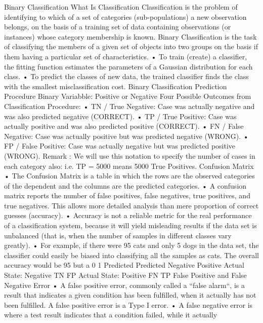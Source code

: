 \documentclass[a4paper,12pt]{article}
\begin{document}
Binary Classification
What Is Classification
Classification is the problem of identifying to which of a set of categories (sub-populations) a new
observation belongs, on the basis of a training set of data containing observations (or instances)
whose category membership is known. Binary Classification is the task of classifying the members of
a given set of objects into two groups on the basis if them having a particular set of characteristics.
• To train (create) a classifier, the fitting function estimates the parameters of a Gaussian
distribution for each class.
• To predict the classes of new data, the trained classifier finds the class with the smallest
misclassification cost.
Binary Classification Prediction Procedure
Binary Variabble: Positive or Negative
Four Possible Outcomes from Classification Procedure:
• TN / True Negative: Case was actually negative and was also predicted negative
(CORRECT).
• TP / True Positive: Case was actually positive and was also predicted positive (CORRECT).
• FN / False Negative: Case was actually positive but was predicted negative
(WRONG).
• FP / False Positive: Case was actually negative but was predicted positive (WRONG).
Remark : We will use this notation to specify the number of cases in each category also: i.e. TP
= 5000 means 5000 True Positives.
Confusion Matrix
• The Confusion Matrix is a table in which the rows are the observed categories of the dependent
and the columns are the predicted categories.
• A confusion matrix reports the number of false positives, false negatives, true positives, and
true negatives. This allows more detailed analysis than mere proportion of correct guesses
(accuracy).
• Accuracy is not a reliable metric for the real performance of a classification system, because
it will yield misleading results if the data set is unbalanced (that is, when the number of
samples in different classes vary greatly).
• For example, if there were 95 cats and only 5 dogs in the data set, the classifier could
easily be biased into classifying all the samples as cats. The overall accuracy would be
95%
but a 0%
1
Predicted Predicted
Negative Positive
Actual State: Negative TN FP
Actual State: Positive FN TP
False Positive and False Negative Error
• A false positive error, commonly called a “false alarm“, is a result that indicates a given
condition has been fulfilled, when it actually has not been fulfilled. A false positive error is
a Type I error.
• A false negative error is where a test result indicates that a condition failed, while it actually
\end{document}
